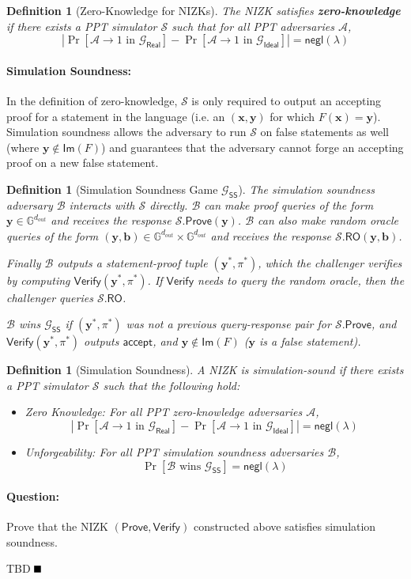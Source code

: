 \documentclass[11pt]{article}
\newtheorem{definition}[theorem]{Definition}
\newenvironment{solution}{\color{blue}\noindent{\bf Solution}\hspace*{1em}}{\qed\medskip}
\newcommand{\qed}{\mbox{}\hspace*{\fill}\nolinebreak\mbox{$\rule{0.6em}{0.6em}$}} %
\numberwithin{equation}{section}
\newcommand{\bfb}{\mathbf{b}}
\newcommand{\bfx}{\mathbf{x}}
\newcommand{\bfy}{\mathbf{y}}
\newcommand{\bbG}{\mathbb{G}}
\newcommand{\cA}{\mathcal{A}}
\newcommand{\cB}{\mathcal{B}}
\newcommand{\cG}{\mathcal{G}}
\newcommand{\cS}{\mathcal{S}}
\newcommand{\Prove}{\mathsf{Prove}}
\newcommand{\Verify}{\mathsf{Verify}}
\newcommand{\RO}{\mathsf{RO}}
\newcommand{\secp}{\lambda}
\newcommand{\negl}{\mathsf{negl}}
\begin{document}
\begin{definition}[Zero-Knowledge for NIZKs]\label{def:zk-for-nizks}
    The NIZK satisfies \textbf{zero-knowledge} if there exists a PPT simulator $\cS$ such that for all PPT adversaries $\cA$, 
    \[\left|\Pr[\cA \to 1 \text{ in } \cG_{\mathsf{Real}}] - \Pr[\cA \to 1 \text{ in } \cG_{\mathsf{Ideal}}]\right| = \negl(\secp)\]
\end{definition}

\paragraph{Simulation Soundness:} In the definition of zero-knowledge, $\cS$ is only required to output an accepting proof for a statement in the language (i.e. an $(\bfx, \bfy)$ for which $F(\bfx) = \bfy$). Simulation soundness allows the adversary to run $\cS$ on false statements as well (where $\bfy \notin \mathsf{Im}(F)$) and guarantees that the adversary cannot forge an accepting proof on a new false statement.

\begin{definition}[Simulation Soundness Game $\cG_{\mathsf{SS}}$]
    The simulation soundness adversary $\cB$ interacts with $\cS$ directly. $\cB$ can make proof queries of the form $\bfy \in \bbG^{d_{out}}$ and receives the response $\cS.\Prove(\bfy)$. $\cB$ can also make random oracle queries of the form $(\bfy, \bfb) \in \bbG^{d_{out}} \times \bbG^{d_{out}}$ and receives the response $\cS.\RO(\bfy, \bfb)$.

    Finally $\cB$ outputs a statement-proof tuple $(\bfy^*, \pi^*)$, which the challenger verifies by computing $\Verify(\bfy^*, \pi^*)$. If $\Verify$ needs to query the random oracle, then the challenger queries $\cS.\RO$. 
    
    $\cB$ wins $\cG_{\mathsf{SS}}$ if $(\bfy^*, \pi^*)$ was not a previous query-response pair for $\cS.\Prove$, and $\Verify(\bfy^*, \pi^*)$ outputs $\mathsf{accept}$, and $\bfy \notin \mathsf{Im}(F)$ ($\bfy$ is a false statement).
\end{definition}

\begin{definition}[Simulation Soundness]
    A NIZK is simulation-sound if there exists a PPT simulator $\cS$ such that the following hold:
    \begin{itemize}
        \item \textit{Zero Knowledge:} For all PPT zero-knowledge adversaries $\cA$,
        \[\left|\Pr[\cA \to 1 \text{ in } \cG_{\mathsf{Real}}] - \Pr[\cA \to 1 \text{ in } \cG_{\mathsf{Ideal}}]\right| = \negl(\secp)\]
        \item \textit{Unforgeability:} For all PPT simulation soundness adversaries $\cB$,
        \[\Pr[\cB \text{ wins } \cG_{\mathsf{SS}}] = \negl(\secp)\]
    \end{itemize}
\end{definition}

\paragraph{Question:} Prove that the NIZK $(\Prove, \Verify)$ constructed above satisfies simulation soundness.

\vspace{5mm}
\begin{solution}
TBD
\end{solution}
\end{document}
